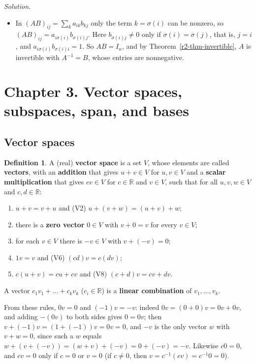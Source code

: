 \documentclass[12pt]{article}
\def\unitnumber{1}
\newcommand{\R}{\mathbb R}
\theoremstyle{definition}
\newtheorem{definition}[theorem]{Definition}
\newenvironment{solution}{\par\noindent\textit{Solution.}\ }{\par\smallskip}
\begin{document}
\begin{solution}
\begin{itemize}
the entries \(b_{\sigma(i)i}=1/a_{i\sigma(i)}\) (\(i=1,\dots,n\)) and all other entries \(0\); it is \(A'\) with every
nonzero entry replaced by its reciprocal, and its entries are nonnegative.
\item In \((AB)_{ij}=\sum_ka_{ik}b_{kj}\) only the term \(k=\sigma(i)\) can be nonzero, so
\((AB)_{ij}=a_{i\sigma(i)}b_{\sigma(i)j}\). Here \(b_{\sigma(i)j}\ne0\) only if \(\sigma(i)=\sigma(j)\), that is,
\(j=i\), and \(a_{i\sigma(i)}b_{\sigma(i)i}=1\). So \(AB=I_n\), and by Theorem~\ref{r2-thm-invertible}, \(A\) is
invertible with \(A^{-1}=B\), whose entries are nonnegative.
\end{itemize}
\end{solution}

\clearpage
\def\unitnumber{3}
\setcounter{theorem}{0}\setcounter{problem}{0}
\section*{Chapter 3. Vector spaces, subspaces, span, and bases}

\subsection*{Vector spaces}

\begin{definition}\label{r3-def-vector-space}
A (real) \textbf{vector space} is a set \(V\), whose elements are called \textbf{vectors}, with
an \textbf{addition} that gives \(u+v\in V\) for \(u,v\in V\) and a \textbf{scalar
multiplication} that gives \(cv\in V\) for \(c\in\R\) and \(v\in V\), such that for all
\(u,v,w\in V\) and \(c,d\in\R\):
\begin{enumerate}[label=(V\arabic*)]
\item \(u+v=v+u\) and (V2) \(u+(v+w)=(u+v)+w\);
\setcounter{enumi}{2}
\item there is a \textbf{zero vector} \(0\in V\) with \(v+0=v\) for every \(v\in V\);
\item for each \(v\in V\) there is \(-v\in V\) with \(v+(-v)=0\);
\item \(1v=v\) and (V6) \((cd)v=c(dv)\);
\setcounter{enumi}{6}
\item \(c(u+v)=cu+cv\) and (V8) \((c+d)v=cv+dv\).
\end{enumerate}
A vector \(c_1v_1+\dots+c_kv_k\) (\(c_i\in\R\)) is a \textbf{linear combination} of
\(v_1,\dots,v_k\).
\end{definition}
From these rules, \(0v=0\) and \((-1)v=-v\): indeed \(0v=(0+0)v=0v+0v\), and adding \(-(0v)\)
to both sides gives \(0=0v\); then \(v+(-1)v=(1+(-1))v=0v=0\), and \(-v\) is the only vector \(w\)
with \(v+w=0\), since such a \(w\) equals \(w+(v+(-v))=(w+v)+(-v)=0+(-v)=-v\). Likewise \(c0=0\), and
\(cv=0\) only if \(c=0\) or \(v=0\) (if \(c\ne0\), then \(v=c^{-1}(cv)=c^{-1}0=0\)).
\end{document}

